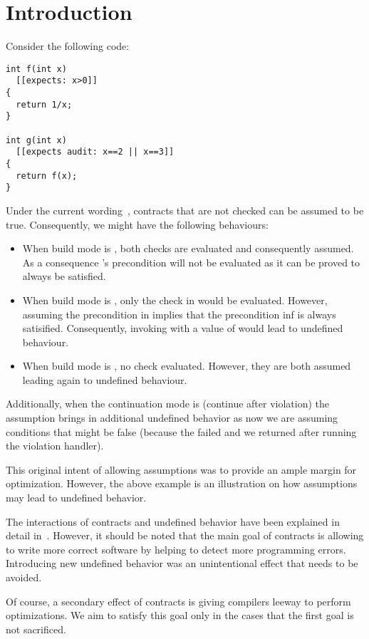 \section{Introduction}

Consider the following code:

\begin{lstlisting}
int f(int x)
  [[expects: x>0]]
{
  return 1/x;
}

int g(int x)
  [[expects audit: x==2 || x==3]]
{
  return f(x);
}
\end{lstlisting}

Under the current wording~\cite{p0542r5}, contracts that are not checked can be assumed to be
true. Consequently, we might have the following behaviours:

\begin{itemize}
  \item When build mode is , both checks are evaluated and
consequently assumed. As a consequence 's precondition will not
be evaluated as it can be proved to always be satisfied.
  \item When build mode is , only the check in 
would be evaluated. However, assuming the precondition in  implies that
the precondition inf  is always satisified. Consequently, invoking
 with a value of  would lead to undefined behaviour.
  \item When build mode is , no check evaluated. However, they are
both assumed leading again to undefined behaviour.
\end{itemize}

Additionally, when the continuation mode is  (continue after violation)
the assumption brings in additional undefined behavior as now we are assuming conditions
that might be false (because the failed and we returned after running the violation
handler).

This original intent of allowing assumptions was to provide an ample margin for
optimization. However, the above example is an illustration on how assumptions
may lead to undefined behavior.

The interactions of contracts and undefined behavior have been explained in
detail in~\cite{p1321r0}. However, it should be noted that the main goal of
contracts is allowing to write more correct software by helping to detect more
programming errors. Introducing new undefined behavior was an unintentional
effect that needs to be avoided.

Of course, a secondary effect of contracts is giving compilers leeway to perform
optimizations. We aim to satisfy this goal only in the cases that the first goal
is not sacrificed.
